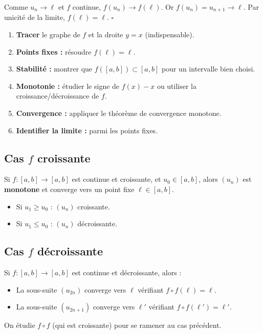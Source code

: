 \begin{proofbox}
Comme $u_n \to \ell$ et $f$ continue, $f(u_n) \to f(\ell)$. Or $f(u_n) = u_{n+1} \to \ell$. Par unicité de la limite, $f(\ell) = \ell$. \hfill$\square$
\end{proofbox}

\begin{methodbox}[Étude complète d'une suite récurrente $u_{n+1} = f(u_n)$]
\begin{enumerate}[leftmargin=1.5cm]
  \item \textbf{Tracer} le graphe de $f$ et la droite $y = x$ (indispensable).
  \item \textbf{Points fixes :} résoudre $f(\ell) = \ell$.
  \item \textbf{Stabilité :} montrer que $f([a,b]) \subset [a,b]$ pour un intervalle bien choisi.
  \item \textbf{Monotonie :} étudier le signe de $f(x) - x$ ou utiliser la croissance/décroissance de $f$.
  \item \textbf{Convergence :} appliquer le théorème de convergence monotone.
  \item \textbf{Identifier la limite :} parmi les points fixes.
\end{enumerate}
\end{methodbox}

\subsection{Cas $f$ croissante}

\begin{propbox}
Si $f : [a,b] \to [a,b]$ est continue et croissante, et $u_0 \in [a,b]$, alors $(u_n)$ est \textbf{monotone} et converge vers un point fixe $\ell \in [a,b]$.
\begin{itemize}[leftmargin=1cm]
  \item Si $u_1 \geqslant u_0$ : $(u_n)$ croissante.
  \item Si $u_1 \leqslant u_0$ : $(u_n)$ décroissante.
\end{itemize}
\end{propbox}

\subsection{Cas $f$ décroissante}

\begin{propbox}
Si $f : [a,b] \to [a,b]$ est continue et décroissante, alors :
\begin{itemize}[leftmargin=1cm]
  \item La sous-suite $(u_{2n})$ converge vers $\ell$ vérifiant $f \circ f(\ell) = \ell$.
  \item La sous-suite $(u_{2n+1})$ converge vers $\ell'$ vérifiant $f \circ f(\ell') = \ell'$.
\end{itemize}
On étudie $f \circ f$ (qui est croissante) pour se ramener au cas précédent.
\end{propbox}

